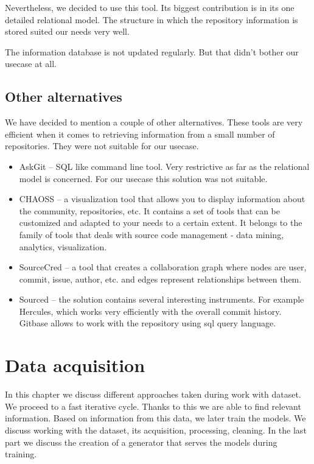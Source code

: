 \documentclass[thesis=M,english]{FITthesis}[2019/12/23]
\begin{document}
Nevertheless, we decided to use this tool. Its biggest contribution is in its one detailed relational model. The structure in which the repository information is stored suited our needs very well.

The information database is not updated regularly. But that didn't bother our usecase at all.

\section{Other alternatives}
We have decided to mention a couple of other alternatives. These tools are very efficient when it comes to retrieving information from a small number of repositories. They were not suitable for our usecase.

\begin{itemize}
		\item AskGit -- SQL like command line tool. Very restrictive as far as the relational model is concerned. For our usecase this solution was not suitable.
		\item CHAOSS -- a visualization tool that allows you to display information about the community, repositories, etc. It contains a set of tools that can be customized and adapted to your needs to a certain extent. It belongs to the family of tools that deals with source code management - data mining, analytics, visualization.
		\item SourceCred -- a tool that creates a collaboration graph where nodes are user, commit, issue, author, etc. and edges represent relationships between them.
		\item Sourced -- the solution contains several interesting instruments. For example Hercules, which works very efficiently with the overall commit history. Gitbase allows to work with the repository using sql query language.
	\end{itemize}

\chapter{Data acquisition}
\label{label:Data_acquisiton}
In this chapter we discuss different approaches taken during work with dataset. We proceed to a fast iterative cycle. Thanks to this we are able to find relevant information. Based on information from this data, we later train the models. We discuss working with the dataset, its acquisition, processing, cleaning. In the last part we discuss the creation of a generator that serves the models during training.
\end{document}
